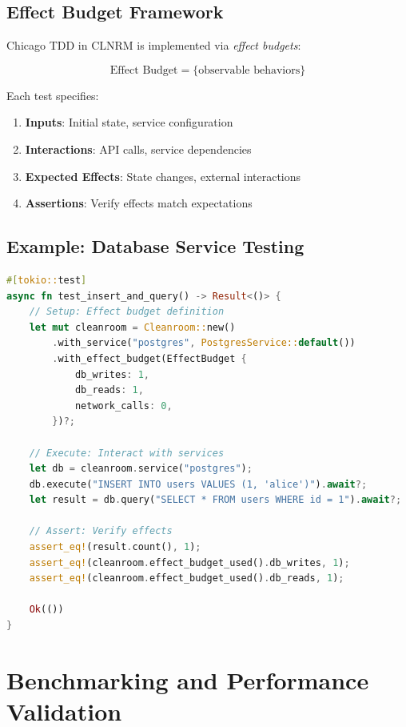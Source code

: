 \documentclass[12pt,twoside,openright]{book}
\theoremstyle{plain}
\theoremstyle{definition}
\theoremstyle{remark}
\begin{document}
\section{Effect Budget Framework}

Chicago TDD in CLNRM is implemented via \textit{effect budgets}:

$$\text{Effect Budget} = \{\text{observable behaviors}\}$$

Each test specifies:

\begin{enumerate}
  \item \textbf{Inputs}: Initial state, service configuration
  \item \textbf{Interactions}: API calls, service dependencies
  \item \textbf{Expected Effects}: State changes, external interactions
  \item \textbf{Assertions}: Verify effects match expectations
\end{enumerate}

\section{Example: Database Service Testing}

\begin{lstlisting}[language=Rust, caption=Chicago TDD Effect Budget]
#[tokio::test]
async fn test_insert_and_query() -> Result<()> {
    // Setup: Effect budget definition
    let mut cleanroom = Cleanroom::new()
        .with_service("postgres", PostgresService::default())
        .with_effect_budget(EffectBudget {
            db_writes: 1,
            db_reads: 1,
            network_calls: 0,
        })?;

    // Execute: Interact with services
    let db = cleanroom.service("postgres");
    db.execute("INSERT INTO users VALUES (1, 'alice')").await?;
    let result = db.query("SELECT * FROM users WHERE id = 1").await?;

    // Assert: Verify effects
    assert_eq!(result.count(), 1);
    assert_eq!(cleanroom.effect_budget_used().db_writes, 1);
    assert_eq!(cleanroom.effect_budget_used().db_reads, 1);

    Ok(())
}
\end{lstlisting}

\chapter{Benchmarking and Performance Validation}
\end{document}
